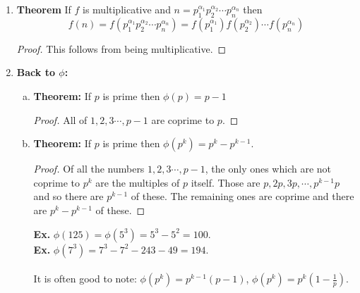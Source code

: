 \documentclass[class=article, crop=false]{standalone}
\begin{document}
\begin{enumerate}
\begin{enumerate}[(a)]
\end{enumerate}

\item \textbf{Theorem} If $f$ is multiplicative and $n=p_1^{\alpha_1} p_2^{\alpha_2}\cdots p_n^{\alpha_n}$
then 
$$f(n) = f(p_1^{\alpha_1} p_2^{\alpha_2}\cdots p_n^{\alpha_n}) = f(p_1^{\alpha_1}) f(p_2^{\alpha_2})\cdots f(p_n^{\alpha_n})$$
\begin{proof}
	This follows from being multiplicative.
\end{proof}

\item \textbf{Back to $\phi$:}
\begin{enumerate}[(a)]
	\item \textbf{Theorem:} If $p$ is prime then $\phi(p)=p-1$
	\begin{proof}
		All of $1,2,3\cdots,p-1$ are coprime to $p$.
	\end{proof}
	
	\item \textbf{Theorem:} If $p$ is prime then $\phi(p^k) = p^{k} - p^{k-1}$.
	\begin{proof}
		Of all the numbers $1,2,3\cdots, p-1$, the only ones which are not coprime to $p^k$
		are the multiples of $p$ itself. Those are $p, 2p, 3p,\cdots,p^{k-1}p$ and so there are
		$p^{k-1}$ of these. The remaining ones are coprime and there are $p^k - p^{k-1}$ of these. 
	\end{proof}
	\noindent\textbf{Ex.} $\phi(125)=\phi(5^3)= 5^3 - 5^2 = 100$. \\
	\textbf{Ex.} $\phi(7^3) = 7^3 - 7^2 - 243 - 49 = 194$. \\\\
	It is often good to note: $\phi(p^k)= p^{k-1} (p-1)$, $\phi(p^k) = p^{k} \left(1-\frac{1}{p}\right)$.


\end{enumerate}
\end{enumerate}
\end{document}
